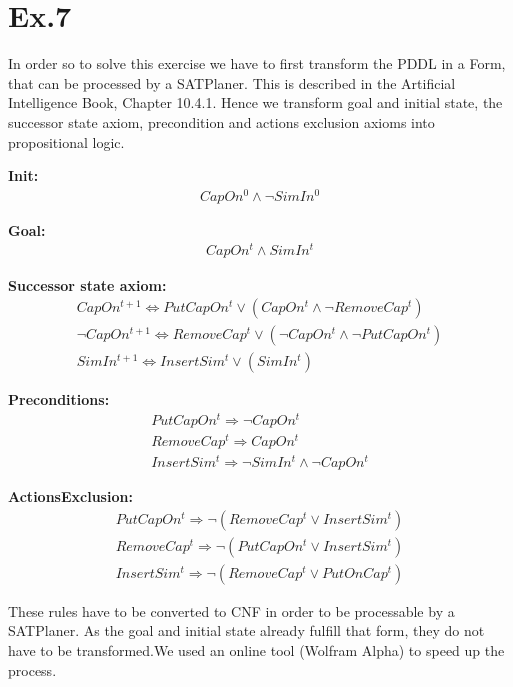 \documentclass[11pt]{article}
\begin{document}
\section*{Ex.7}

In order so to solve this exercise we have to first transform the PDDL in a Form, that can be processed by a SATPlaner. This is described in the Artificial Intelligence Book, Chapter 10.4.1.
Hence we transform goal and initial state, the successor state axiom, precondition and actions exclusion axioms into propositional logic. 
\newline

\textbf{Init:}
\begin{align}
CapOn^{0} \wedge \neg SimIn^{0}
\end{align}

\textbf{Goal:}
\begin{align}
CapOn^{t} \wedge SimIn^{t}
\end{align}

\textbf{Successor state axiom:}
\begin{align}
CapOn^{t+1} \Leftrightarrow PutCapOn^{t} \vee (CapOn^{t} \wedge \neg RemoveCap^{t})\\
\neg CapOn^{t+1} \Leftrightarrow RemoveCap^{t} \vee (\neg CapOn^{t} \wedge \neg PutCapOn^{t})\\
SimIn^{t+1} \Leftrightarrow InsertSim^{t} \vee (SimIn^{t})
\end{align}

\textbf{Preconditions:}
\begin{align}
PutCapOn^{t} \Rightarrow \neg CapOn^{t} \\
RemoveCap^{t} \Rightarrow CapOn^{t} \\
InsertSim^{t} \Rightarrow \neg SimIn^{t} \wedge \neg CapOn^{t}
\end{align}

\textbf{ActionsExclusion:}
\begin{align}
PutCapOn^{t} \Rightarrow \neg (RemoveCap^{t} \vee InsertSim^{t}) \\
RemoveCap^{t} \Rightarrow \neg (PutCapOn^{t} \vee InsertSim^{t}) \\
InsertSim^{t} \Rightarrow \neg (RemoveCap^{t} \vee PutOnCap^{t})
\end{align}
\newpage

\noindent
These rules have to be converted to CNF in order to be processable by a SATPlaner. As the goal and initial state already fulfill that form, they do not have to be transformed.We used an online tool (Wolfram Alpha) to speed up the process.\newline
\end{document}
